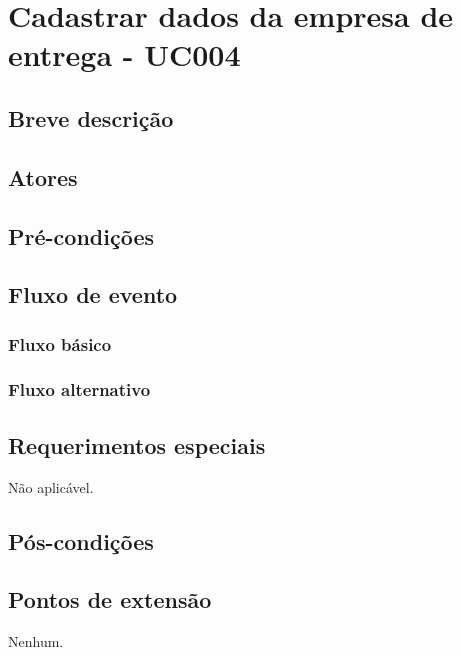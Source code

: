 \chapter{Cadastrar dados da empresa de entrega - UC004} \label{uc004}

\section{Breve descrição}

\section{Atores}

\section{Pré-condições}

\section{Fluxo de evento}

\subsection{Fluxo básico}

\subsection{Fluxo alternativo}

\section{Requerimentos especiais}

Não aplicável.

\section{Pós-condições}

\section{Pontos de extensão}

Nenhum.